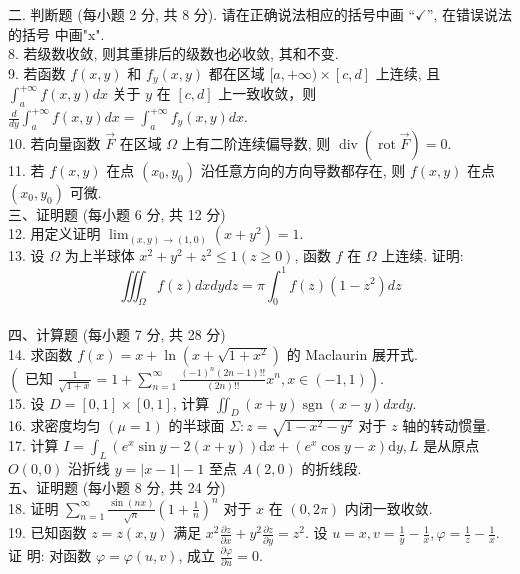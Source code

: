 \documentclass[a4paper,11pt,UTF8]{article}
\begin{document}
二. 判断题 (每小题 2 分, 共 8 分). 请在正确说法相应的括号中画 “$\checkmark$”, 在错误说法的括号 中画"x".\\
8. 若级数收敛, 则其重排后的级数也必收敛, 其和不变.\\
9. 若函数 $f(x, y)$ 和 $f_y(x, y)$ 都在区域 $[a,+\infty) \times[c, d]$ 上连续, 且 $\displaystyle \int_a^{+\infty} f(x, y) d x$ 关于 $y$ 在 $[c, d]$ 上一致收敛，则 $\displaystyle \frac{d}{d y} \int_a^{+\infty} f(x, y) d x=\int_a^{+\infty} f_y(x, y) d x$.\\
10. 若向量函数 $\vec{F}$ 在区域 $\Omega$ 上有二阶连续偏导数, 则 $\operatorname{div}(\operatorname{rot} \vec{F})=0$.\\
11. 若 $f(x, y)$ 在点 $\left(x_0, y_0\right)$ 沿任意方向的方向导数都存在, 则 $f(x, y)$ 在点 $\left(x_0, y_0\right)$ 可微.\\
三、证明题 (每小题 6 分, 共 12 分)\\
12. 用定义证明 $\displaystyle \lim _{(x, y) \rightarrow(1,0)}\left(x+y^2\right)=1$.\\
13. 设 $\Omega$ 为上半球体 $x^2+y^2+z^2 \leq 1(z \geq 0)$, 函数 $f$ 在 $\Omega$ 上连续. 证明:
$$
\iiint_{\Omega} f(z) d x d y d z=\pi \int_0^1 f(z)\left(1-z^2\right) d z
$$\\
四、计算题 (每小题 7 分, 共 28 分)\\
14. 求函数 $f(x)=x+\ln \left(x+\sqrt{1+x^2}\right)$ 的 Maclaurin 展开式.\\
$
\displaystyle \left(\text { 已知 } \frac{1}{\sqrt{1+x}}=1+\sum_{n=1}^{\infty} \frac{(-1)^n(2 n-1) ! !}{(2 n) ! !} x^n, x \in(-1,1)\right) \text {. }
$\\
15. 设 $D=[0,1] \times[0,1]$, 计算 $\displaystyle \iint_D(x+y) \operatorname{sgn}(x-y) d x d y$.\\
16. 求密度均匀 $(\mu=1)$ 的半球面 $\displaystyle \Sigma: z=\sqrt{1-x^2-y^2}$ 对于 $z$ 轴的转动惯量.\\
17. 计算 $\displaystyle I=\int_L\left(e^x \sin y-2(x+y)\right) \mathrm{d} x+\left(e^x \cos y-x\right) \mathrm{d} y, L$ 是从原点 $O(0,0)$ 沿折线 $y=|x-1|-1$ 至点 $A(2,0)$ 的折线段.\\
五、证明题 (每小题 8 分, 共 24 分)\\
18. 证明 $\displaystyle \sum_{n=1}^{\infty} \frac{\sin (n x)}{\sqrt{n}}\left(1+\frac{1}{n}\right)^n$ 对于 $x$ 在 $(0,2 \pi)$ 内闭一致收敛.\\
19. 已知函数 $z=z(x, y)$ 满足 $\displaystyle x^2 \frac{\partial z}{\partial x}+y^2 \frac{\partial z}{\partial y}=z^2$. 设 $u=x, v=\frac{1}{y}-\frac{1}{x}, \varphi=\frac{1}{z}-\frac{1}{x}$. 证 明: 对函数 $\varphi=\varphi(u, v)$, 成立 $\displaystyle \frac{\partial \varphi}{\partial u}=0$.\\
\end{document}
